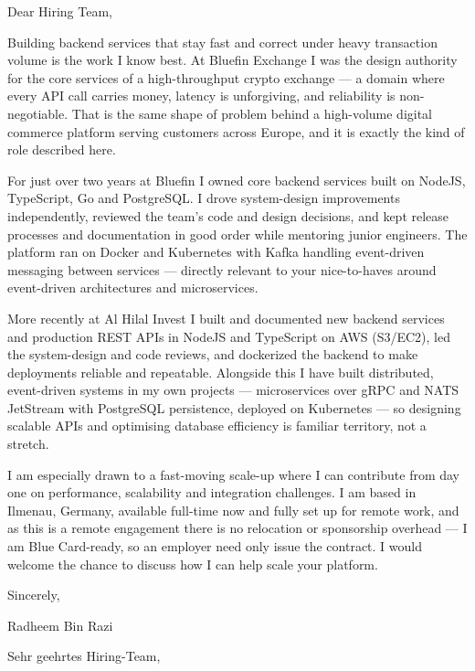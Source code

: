 \documentclass[11pt,a4paper]{coverletter}
\begin{document}

\opening{Dear Hiring Team,}

Building backend services that stay fast and correct under heavy transaction volume is the work I know best. At Bluefin Exchange I was the design authority for the core services of a high-throughput crypto exchange — a domain where every API call carries money, latency is unforgiving, and reliability is non-negotiable. That is the same shape of problem behind a high-volume digital commerce platform serving customers across Europe, and it is exactly the kind of role described here.

For just over two years at Bluefin I owned core backend services built on NodeJS, TypeScript, Go and PostgreSQL. I drove system-design improvements independently, reviewed the team's code and design decisions, and kept release processes and documentation in good order while mentoring junior engineers. The platform ran on Docker and Kubernetes with Kafka handling event-driven messaging between services — directly relevant to your nice-to-haves around event-driven architectures and microservices.

More recently at Al Hilal Invest I built and documented new backend services and production REST APIs in NodeJS and TypeScript on AWS (S3/EC2), led the system-design and code reviews, and dockerized the backend to make deployments reliable and repeatable. Alongside this I have built distributed, event-driven systems in my own projects — microservices over gRPC and NATS JetStream with PostgreSQL persistence, deployed on Kubernetes — so designing scalable APIs and optimising database efficiency is familiar territory, not a stretch.

I am especially drawn to a fast-moving scale-up where I can contribute from day one on performance, scalability and integration challenges. I am based in Ilmenau, Germany, available full-time now and fully set up for remote work, and as this is a remote engagement there is no relocation or sponsorship overhead — I am Blue Card-ready, so an employer need only issue the contract. I would welcome the chance to discuss how I can help scale your platform.

\closing{Sincerely,}{Radheem Bin Razi}

\clearpage
{}


\opening{Sehr geehrtes Hiring-Team,}
\end{document}
